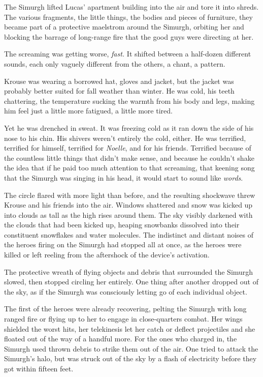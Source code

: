 The Simurgh lifted Lucas' apartment building into the air and tore it into shreds.  The various fragments, the little things, the bodies and pieces of furniture, they became part of a protective maelstrom around the Simurgh, orbiting her and blocking the barrage of long-range fire that the good guys were directing at her.



The screaming was getting worse, \emph{fast.  }It shifted between a half-dozen different sounds, each only vaguely different from the others, a chant, a pattern.



Krouse was wearing a borrowed hat, gloves and jacket, but the jacket was probably better suited for fall weather than winter.  He was cold, his teeth chattering, the temperature sucking the warmth from his body and legs, making him feel just a little more fatigued, a little more tired.



Yet he was drenched in sweat.  It was freezing cold as it ran down the side of his nose to his chin.  His shivers weren't entirely the cold, either.  He was terrified, terrified for himself, terrified for \emph{Noelle}, and for his friends.  Terrified because of the countless little things that didn't make sense, and because he couldn't shake the idea that if he paid too much attention to that screaming, that keening song that the Simurgh was singing in his head, it would start to sound like \emph{words}.



The circle flared with more light than before, and the resulting shockwave threw Krouse and his friends into the air.  Windows shattered and snow was kicked up into clouds as tall as the high rises around them.  The sky visibly darkened with the clouds that had been kicked up, heaping snowbanks dissolved into their constituent snowflakes and water molecules.  The indistinct and distant noises of the heroes firing on the Simurgh had stopped all at once, as the heroes were killed or left reeling from the aftershock of the device's activation.



The protective wreath of flying objects and debris that surrounded the Simurgh slowed, then stopped circling her entirely.  One thing after another dropped out of the sky, as if the Simurgh was consciously letting go of each individual object.



The first of the heroes were already recovering, pelting the Simurgh with long ranged fire or flying up to her to engage in close-quarters combat.  Her wings shielded the worst hits, her telekinesis let her catch or deflect projectiles and she floated out of the way of a handful more.  For the ones who charged in, the Simurgh used thrown debris to strike them out of the air.  One tried to attack the Simurgh's halo, but was struck out of the sky by a flash of electricity before they got within fifteen feet.



